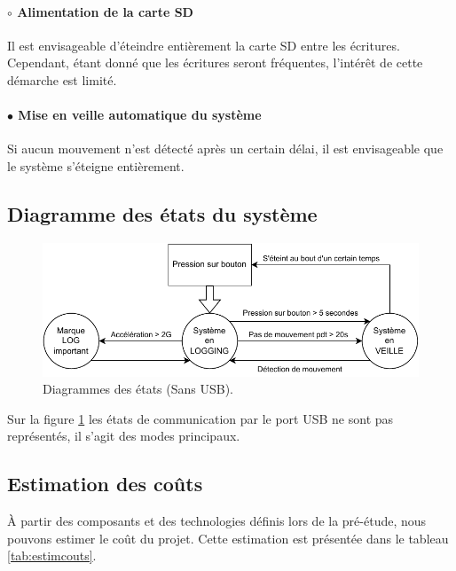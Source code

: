 \paragraph{$\circ$ Alimentation de la carte SD} Il est envisageable d'éteindre entièrement la carte SD entre les écritures. Cependant, étant donné que les écritures seront fréquentes, l'intérêt de cette démarche est limité.

\paragraph{$\bullet$ Mise en veille automatique du système} Si aucun mouvement n'est détecté après un certain délai, il est envisageable que le système s'éteigne entièrement.

\subsection{Diagramme des états du système} 

\begin{figure}[h]
	\centering
	\includegraphics[width=0.8\linewidth]{../figures/pre_etude/Diagramme_Etat_Preetude}
	\caption{Diagrammes des états (Sans USB).}
	\label{fig:diagrammeetatpreetude}
\end{figure}

Sur la figure \ref{fig:diagrammeetatpreetude} les états de communication par le port USB ne sont pas représentés, il s'agit des modes principaux.


\clearpage

\subsection{Estimation des coûts} \label{ssec:Estimation-Couts}

À partir des composants et des technologies définis lors de la pré-étude, nous pouvons estimer le coût du projet. Cette estimation est présentée dans le tableau \ref{tab:estimcouts}.

